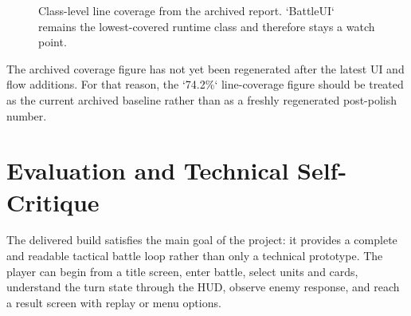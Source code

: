 \begin{figure}[H]
\centering
{}
\caption{Class-level line coverage from the archived report. `BattleUI` remains the lowest-covered runtime class and therefore stays a watch point.}
\label{fig:class-line-coverage}
\end{figure}

The archived coverage figure has not yet been regenerated after the latest UI and flow additions. For that reason, the `74.2\%` line-coverage figure should be treated as the current archived baseline rather than as a freshly regenerated post-polish number.

\section{Evaluation and Technical Self-Critique}

The delivered build satisfies the main goal of the project: it provides a complete and readable tactical battle loop rather than only a technical prototype. The player can begin from a title screen, enter battle, select units and cards, understand the turn state through the HUD, observe enemy response, and reach a result screen with replay or menu options.

